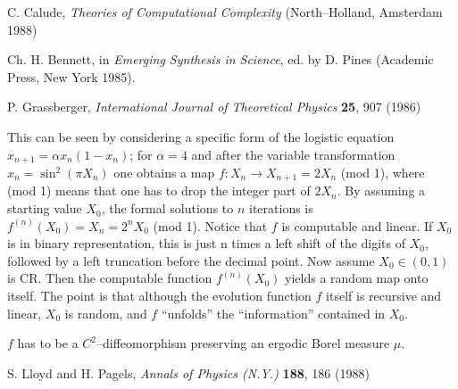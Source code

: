 \begin{thebibliography}{999}
C. Calude, {\sl Theories of Computational Complexity} (North--Holland,
Amsterdam 1988)

Ch. H. Bennett, in {\it Emerging Synthesis in Science}, ed. by D. Pines
(Academic Press, New York 1985).

P. Grassberger, {\sl International Journal of Theoretical Physics} {\bf
25}, 907 (1986)

This can be seen by considering a specific form of the logistic equation
$x_{n+1}=\alpha x_n (1-x_n)$;
for $\alpha =4$ and after the variable transformation $x_n=\sin^2(\pi
X_n)$ one obtains a map $f:X_n\rightarrow X_{n+1}=2X_n$ (mod 1),
where (mod 1) means that one has to drop the integer part of $2X_n$.
By assuming a starting value $X_0$, the formal solutions to $n$
iterations is $f^{(n)}(X_0)=X_n=2^nX_0$ (mod 1).
Notice that $f$ is computable and linear.
If $X_0$ is in binary representation, this is just n times a left shift
of the digits of $X_0$, followed by a left truncation before the decimal
point.
Now assume $X_0\in (0,1)$ is CR.
Then the computable function $f^{(n)}(X_0)$ yields a random map onto
itself.
The point is that although the evolution function $f$ itself is
recursive and linear, $X_0$ is random, and $f$ ``unfolds'' the
``information'' contained in $X_0$.

$f$ has to be a $C^2$--diffeomorphism preserving an ergodic Borel
measure $\mu $.

S. Lloyd and H. Pagels, {\sl Annals of Physics (N.Y.)} {\bf 188}, 186
(1988)
\end{thebibliography}

